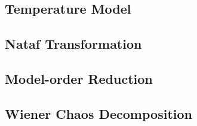 \subsection{Temperature Model} 

\subsection{Nataf Transformation} 

\subsection{Model-order Reduction} 

\subsection{Wiener Chaos Decomposition} 

